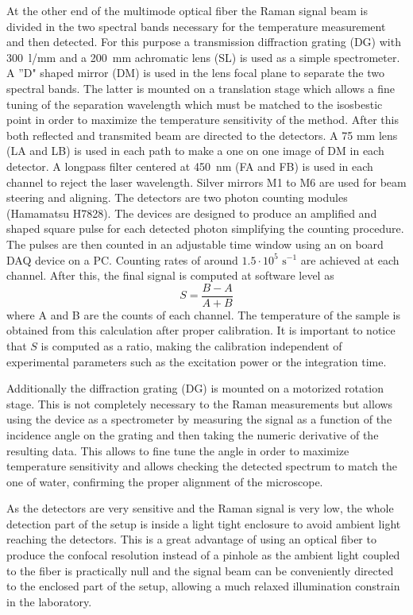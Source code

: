 \documentclass[9pt,twocolumn,twoside]{osajnl}
\begin{document}
At the other end of the multimode optical fiber the Raman signal beam is divided in the two spectral bands necessary for the temperature measurement and then detected. For this purpose a transmission diffraction grating (DG) with 300~l/mm and a 200~mm achromatic lens (SL) is used as a simple spectrometer. A ''D" shaped mirror (DM) is used in the lens focal plane to separate the two spectral bands. The latter is mounted on a translation stage which allows a fine tuning of the separation wavelength which must be matched to the isosbestic point in order to maximize the temperature sensitivity of the method. After this both reflected and transmited beam are directed to the detectors. A 75 mm lens (LA and LB) is used in each path to make a one on one image of DM in each detector. A longpass filter centered at 450~nm (FA and FB) is used in each channel to reject the laser wavelength. Silver mirrors M1 to M6 are used for beam steering and aligning. The detectors are two photon counting modules (Hamamatsu H7828). The devices are designed to produce an amplified and shaped square pulse for each detected photon simplifying the counting procedure. The pulses are then counted in an adjustable time window using an on board DAQ device on a PC. Counting rates of around $1.5 \cdot 10^5 \,\,\mathrm{s}^{-1}$ are achieved at each channel. After this, the final signal is computed at software level as
\begin{equation}\label{eq:S}
S = \frac{B - A}{A + B}
\end{equation}
where A and B are the counts of each channel. The temperature of the sample is obtained from this calculation after proper calibration.  It is important to notice that $S$ is computed as a ratio, making the calibration independent of experimental parameters such as the excitation power or the integration time.

Additionally the diffraction grating (DG) is mounted on a motorized rotation stage.  This is not completely necessary to the Raman measurements but allows using the device as a spectrometer by measuring the signal as a function of the incidence angle on the grating and then taking the numeric derivative of the resulting data. This allows to fine tune the angle in order to maximize temperature sensitivity and allows checking the detected spectrum to match the one of water, confirming the proper alignment of the microscope. 

As the detectors are very sensitive and the Raman signal is very low, the whole detection part of the setup is inside a light tight enclosure to avoid ambient light reaching the detectors. This is a great advantage of using an optical fiber to produce the confocal resolution instead of a pinhole as the ambient light coupled to the fiber is practically null and the signal beam can be conveniently directed to the enclosed part of the setup, allowing a much relaxed illumination constrain in the laboratory. 
\end{document}
